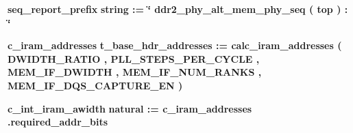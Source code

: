 \begin{DoxyCompactItemize}
\item 
{\bf seq\+\_\+report\+\_\+prefix} {\bfseries \textcolor{comment}{string}\textcolor{vhdlchar}{ }\textcolor{vhdlchar}{ }\textcolor{vhdlchar}{\+:}\textcolor{vhdlchar}{=}\textcolor{vhdlchar}{ }\textcolor{vhdlchar}{ }\textcolor{vhdlchar}{ }\textcolor{vhdlchar}{ }\textcolor{keyword}{\char`\"{} ddr2\+\_\+phy\+\_\+alt\+\_\+mem\+\_\+phy\+\_\+seq ( top )  \+:  \char`\"{}}\textcolor{vhdlchar}{ }} 
\item 
{\bf c\+\_\+iram\+\_\+addresses} {\bfseries \textcolor{vhdlchar}{t\+\_\+base\+\_\+hdr\+\_\+addresses}\textcolor{vhdlchar}{ }\textcolor{vhdlchar}{ }\textcolor{vhdlchar}{\+:}\textcolor{vhdlchar}{=}\textcolor{vhdlchar}{ }\textcolor{vhdlchar}{ }\textcolor{vhdlchar}{ }\textcolor{vhdlchar}{ }\textcolor{vhdlchar}{calc\+\_\+iram\+\_\+addresses}\textcolor{vhdlchar}{ }\textcolor{vhdlchar}{(}\textcolor{vhdlchar}{ }\textcolor{vhdlchar}{ }\textcolor{vhdlchar}{ }\textcolor{vhdlchar}{ }{\bfseries {\bf D\+W\+I\+D\+T\+H\+\_\+\+R\+A\+T\+IO}} \textcolor{vhdlchar}{ }\textcolor{vhdlchar}{,}\textcolor{vhdlchar}{ }\textcolor{vhdlchar}{ }\textcolor{vhdlchar}{ }\textcolor{vhdlchar}{ }{\bfseries {\bf P\+L\+L\+\_\+\+S\+T\+E\+P\+S\+\_\+\+P\+E\+R\+\_\+\+C\+Y\+C\+LE}} \textcolor{vhdlchar}{ }\textcolor{vhdlchar}{,}\textcolor{vhdlchar}{ }\textcolor{vhdlchar}{ }\textcolor{vhdlchar}{ }\textcolor{vhdlchar}{ }{\bfseries {\bf M\+E\+M\+\_\+\+I\+F\+\_\+\+D\+W\+I\+D\+TH}} \textcolor{vhdlchar}{ }\textcolor{vhdlchar}{,}\textcolor{vhdlchar}{ }\textcolor{vhdlchar}{ }\textcolor{vhdlchar}{ }\textcolor{vhdlchar}{ }{\bfseries {\bf M\+E\+M\+\_\+\+I\+F\+\_\+\+N\+U\+M\+\_\+\+R\+A\+N\+KS}} \textcolor{vhdlchar}{ }\textcolor{vhdlchar}{,}\textcolor{vhdlchar}{ }\textcolor{vhdlchar}{ }\textcolor{vhdlchar}{ }\textcolor{vhdlchar}{ }{\bfseries {\bf M\+E\+M\+\_\+\+I\+F\+\_\+\+D\+Q\+S\+\_\+\+C\+A\+P\+T\+U\+R\+E\+\_\+\+EN}} \textcolor{vhdlchar}{ }\textcolor{vhdlchar}{)}\textcolor{vhdlchar}{ }} 
\item 
{\bf c\+\_\+int\+\_\+iram\+\_\+awidth} {\bfseries \textcolor{comment}{natural}\textcolor{vhdlchar}{ }\textcolor{vhdlchar}{ }\textcolor{vhdlchar}{\+:}\textcolor{vhdlchar}{=}\textcolor{vhdlchar}{ }\textcolor{vhdlchar}{ }\textcolor{vhdlchar}{ }\textcolor{vhdlchar}{ }{\bfseries {\bf c\+\_\+iram\+\_\+addresses}} \textcolor{vhdlchar}{.}\textcolor{vhdlchar}{required\+\_\+addr\+\_\+bits}\textcolor{vhdlchar}{ }} 
\item 

\end{DoxyCompactItemize}
